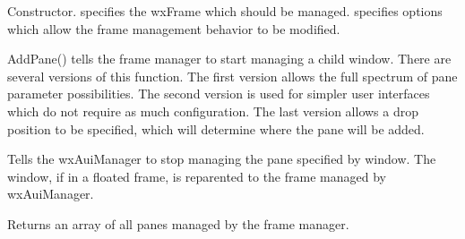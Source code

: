 

\label{wxauimanagerwxauimanager}


Constructor.  specifies the wxFrame which should be managed.
  specifies options which allow the frame management behavior
to be modified.

\label{wxauimanagerdtor}


\label{wxauimanageraddpane}





AddPane() tells the frame manager to start managing a child window. There are several versions of this function. The first version allows the full spectrum of pane parameter possibilities. The second version is used for simpler user interfaces which do not require as much configuration.  The last version allows a drop position to be specified, which will determine where the pane will be added.

\label{wxauimanagerdetachpane}


Tells the wxAuiManager to stop managing the pane specified by window.
The window, if in a floated frame, is reparented to the frame managed
by wxAuiManager.

\label{wxauimanagergetallpanes}


Returns an array of all panes managed by the frame manager.

\label{wxauimanagergetartprovider}

